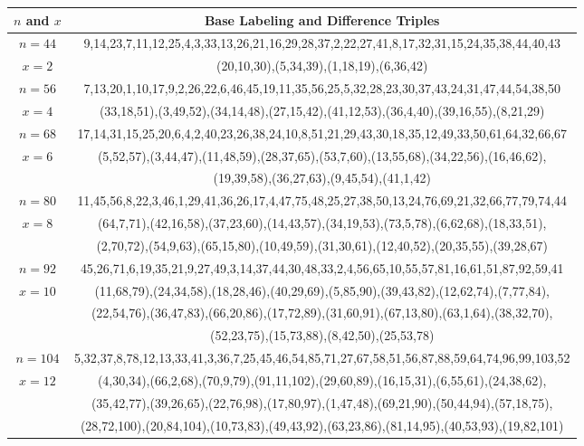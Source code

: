 \begin{tabular}{| c | c |}
\hline
\(n\) and \(x\) & Base Labeling and Difference Triples\\
\hline
\(n=44\) & 
9,14,23,7,11,12,25,4,3,33,13,26,21,16,29,28,37,2,22,27,41,8,17,32,31,15,24,35,38,44,40,43\\
\cline{2-2}
\(x=2\)
&(20,10,30),(5,34,39),(1,18,19),(6,36,42)\\
\hline 
\(n=56\) & 
7,13,20,1,10,17,9,2,26,22,6,46,45,19,11,35,56,25,5,32,28,23,30,37,43,24,31,47,44,54,38,50\\
\cline{2-2}
\(x=4\)
&(33,18,51),(3,49,52),(34,14,48),(27,15,42),(41,12,53),(36,4,40),(39,16,55),(8,21,29)\\
\hline 
\(n=68\) & 
17,14,31,15,25,20,6,4,2,40,23,26,38,24,10,8,51,21,29,43,30,18,35,12,49,33,50,61,64,32,66,67\\
\cline{2-2}
\(x=6\)
&(5,52,57),(3,44,47),(11,48,59),(28,37,65),(53,7,60),(13,55,68),(34,22,56),(16,46,62),\\
&(19,39,58),(36,27,63),(9,45,54),(41,1,42)\\
\hline 
\(n=80\) & 
11,45,56,8,22,3,46,1,29,41,36,26,17,4,47,75,48,25,27,38,50,13,24,76,69,21,32,66,77,79,74,44\\
\cline{2-2}
\(x=8\)
&(64,7,71),(42,16,58),(37,23,60),(14,43,57),(34,19,53),(73,5,78),(6,62,68),(18,33,51),\\
&(2,70,72),(54,9,63),(65,15,80),(10,49,59),(31,30,61),(12,40,52),(20,35,55),(39,28,67)\\
\hline 
\(n=92\) & 
45,26,71,6,19,35,21,9,27,49,3,14,37,44,30,48,33,2,4,56,65,10,55,57,81,16,61,51,87,92,59,41\\
\cline{2-2}
\(x=10\)
&(11,68,79),(24,34,58),(18,28,46),(40,29,69),(5,85,90),(39,43,82),(12,62,74),(7,77,84),\\
&(22,54,76),(36,47,83),(66,20,86),(17,72,89),(31,60,91),(67,13,80),(63,1,64),(38,32,70),\\
&(52,23,75),(15,73,88),(8,42,50),(25,53,78)\\
\hline 
\(n=104\) & 
5,32,37,8,78,12,13,33,41,3,36,7,25,45,46,54,85,71,27,67,58,51,56,87,88,59,64,74,96,99,103,52\\
\cline{2-2}
\(x=12\)
&(4,30,34),(66,2,68),(70,9,79),(91,11,102),(29,60,89),(16,15,31),(6,55,61),(24,38,62),\\
&(35,42,77),(39,26,65),(22,76,98),(17,80,97),(1,47,48),(69,21,90),(50,44,94),(57,18,75),\\
&(28,72,100),(20,84,104),(10,73,83),(49,43,92),(63,23,86),(81,14,95),(40,53,93),(19,82,101)\\

\end{tabular}
